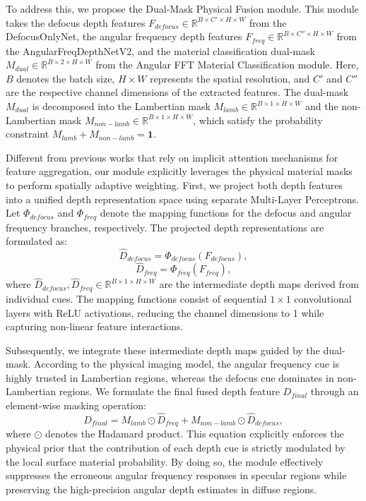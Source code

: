 To address this, we propose the Dual-Mask Physical Fusion module. This module takes the defocus depth features $F_{defocus} \in \mathbb{R}^{B \times C' \times H \times W}$ from the DefocusOnlyNet, the angular frequency depth features $F_{freq} \in \mathbb{R}^{B \times C'' \times H \times W}$ from the AngularFreqDepthNetV2, and the material classification dual-mask $M_{dual} \in \mathbb{R}^{B \times 2 \times H \times W}$ from the Angular FFT Material Classification module. Here, $B$ denotes the batch size, $H \times W$ represents the spatial resolution, and $C'$ and $C''$ are the respective channel dimensions of the extracted features. The dual-mask $M_{dual}$ is decomposed into the Lambertian mask $M_{lamb} \in \mathbb{R}^{B \times 1 \times H \times W}$ and the non-Lambertian mask $M_{non-lamb} \in \mathbb{R}^{B \times 1 \times H \times W}$, which satisfy the probability constraint $M_{lamb} + M_{non-lamb} = \mathbf{1}$.

Different from previous works that rely on implicit attention mechanisms for feature aggregation, our module explicitly leverages the physical material masks to perform spatially adaptive weighting. First, we project both depth features into a unified depth representation space using separate Multi-Layer Perceptrons. Let $\Phi_{defocus}$ and $\Phi_{freq}$ denote the mapping functions for the defocus and angular frequency branches, respectively. The projected depth representations are formulated as:
\begin{equation}
\label{eq:eq23}
\hat{D}_{defocus} = \Phi_{defocus}(F_{defocus}),
\end{equation}
\begin{equation}
\label{eq:eq24}
\hat{D}_{freq} = \Phi_{freq}(F_{freq}),
\end{equation}
where $\hat{D}_{defocus}, \hat{D}_{freq} \in \mathbb{R}^{B \times 1 \times H \times W}$ are the intermediate depth maps derived from individual cues. The mapping functions consist of sequential $1 \times 1$ convolutional layers with ReLU activations, reducing the channel dimensions to 1 while capturing non-linear feature interactions.

Subsequently, we integrate these intermediate depth maps guided by the dual-mask. According to the physical imaging model, the angular frequency cue is highly trusted in Lambertian regions, whereas the defocus cue dominates in non-Lambertian regions. We formulate the final fused depth feature $D_{final}$ through an element-wise masking operation:
\begin{equation}
\label{eq:eq25}
D_{final} = M_{lamb} \odot \hat{D}_{freq} + M_{non-lamb} \odot \hat{D}_{defocus},
\end{equation}
where $\odot$ denotes the Hadamard product. This equation explicitly enforces the physical prior that the contribution of each depth cue is strictly modulated by the local surface material probability. By doing so, the module effectively suppresses the erroneous angular frequency responses in specular regions while preserving the high-precision angular depth estimates in diffuse regions.

